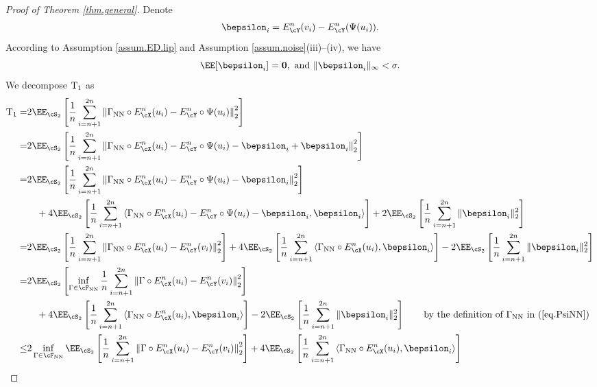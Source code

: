 \documentclass[11pt]{article} %
\begin{document}
\begin{proof}[Proof of Theorem \ref{thm.general}]
Denote
\begin{align}
	\bepsilon_i=E^n_{\cY}(v_i)-E^n_{\cY}(\Psi(u_i)).
	\label{eq.epsilon}
\end{align}
According to Assumption \ref{assum.ED.lip} and Assumption \ref{assum.noise}(iii)--(iv), we have $$\EE[\bepsilon_i]=\mathbf{0}, \text{ and }\|\bepsilon_i\|_{\infty}<\sigma.$$
We decompose ${\rm T_1}$ as
 \begin{align}
 	{\rm T_1}=&2\EE_{\cS_2}\left[\frac{1}{n}\sum_{i=n+1}^{2n}\left\| \Gamma_{\rm NN} \circ E_{\cX}^n(u_i)- E_{\cY}^n\circ\Psi(u_i)\right\|_{2}^2\right] \nonumber\\
 	=&2\EE_{\cS_2}\left[\frac{1}{n}\sum_{i=n+1}^{2n}\left\| \Gamma_{\rm NN} \circ E_{\cX}^n(u_i)- E_{\cY}^n\circ\Psi(u_i)-\bepsilon_i+\bepsilon_i\right\|_{2}^2\right] \nonumber\\
 	=&2\EE_{\cS_2}\left[\frac{1}{n}\sum_{i=n+1}^{2n}\left\| \Gamma_{\rm NN} \circ E_{\cX}^n(u_i)- E_{\cY}^n\circ\Psi(u_i)-\bepsilon_i\right\|_2^2\right]\nonumber \\
 	&\quad +4\EE_{\cS_2}\left[\frac{1}{n}\sum_{i=n+1}^{2n}\left\langle \Gamma_{\rm NN} \circ E_{\cX}^n(u_i)- E_{\cY}^n\circ\Psi(u_i)-\bepsilon_i, \bepsilon_i\right\rangle\right]+ 2\EE_{\cS_2}\left[\frac{1}{n}\sum_{i=n+1}^{2n}\|\bepsilon_i\|_{2}^2\right] \nonumber\\
 	=&2\EE_{\cS_2}\left[\frac{1}{n}\sum_{i=n+1}^{2n}\left\| \Gamma_{\rm NN} \circ E_{\cX}^n(u_i)- E_{\cY}^n(v_i)\right\|_2^2\right]  +4\EE_{\cS_2}\left[\frac{1}{n}\sum_{i=n+1}^{2n}\left\langle \Gamma_{\rm NN} \circ E_{\cX}^n(u_i), \bepsilon_i\right \rangle \right]- 2\EE_{\cS_2}\left[ \frac{1}{n}\sum_{i=n+1}^{2n} \|\bepsilon_i\|_{2}^2 \right] \nonumber\\
 	= &2\EE_{\cS_2}\left[\inf_{\Gamma\in \cF_{\rm NN}}\frac{1}{n}\sum_{i=n+1}^{2n}\left\| \Gamma \circ E_{\cX}^n(u_i)- E_{\cY}^n(v_i)\right\|_{2}^2\right] \nonumber\\
 	&\quad +4\EE_{\cS_2}\left[\frac{1}{n}\sum_{i=n+1}^{2n}\left\langle \Gamma_{\rm NN} \circ E_{\cX}^n(u_i), \bepsilon_i\right\rangle\right]- 2\EE_{\cS_2}\left[\frac{1}{n}\sum_{i=n+1}^{2n}\|\bepsilon_i\|_{2}^2\right] \nonumber \tag*{by the definition of $\Gamma_{\rm NN}$ in (\ref{eq.PsiNN})}\nonumber\\
 	\leq& 2\inf_{\Gamma\in \cF_{\rm NN}}\EE_{\cS_2}\left[\frac{1}{n}\sum_{i=n+1}^{2n}\left\| \Gamma \circ E_{\cX}^n(u_i)- E_{\cY}^n(v_i)\right\|_{2}^2\right]  +4\EE_{\cS_2}\left[\frac{1}{n}\sum_{i=n+1}^{2n}\left\langle \Gamma_{\rm NN} \circ E_{\cX}^n(u_i), \bepsilon_i\right\rangle \right]\nonumber\\

\end{align}
\end{proof}
\end{document}
